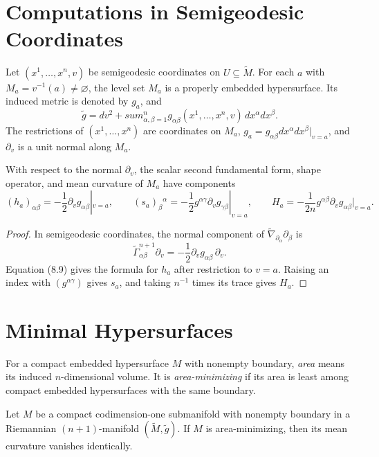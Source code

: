 \section{Computations in Semigeodesic Coordinates}

Let $(x^1,\ldots,x^n,v)$ be semigeodesic coordinates on
$U\subseteq\widetilde M$. For each $a$ with
$M_a=v^{-1}(a)\ne\varnothing$, the level set $M_a$ is a properly embedded
hypersurface. Its induced metric is denoted by $g_a$, and
\begin{equation}
\widetilde g=dv^2+sum_{\alpha,\beta=1}^n
g_{\alpha\beta}(x^1,\ldots,x^n,v)\,dx^\alpha dx^\beta. \tag{8.13}
\end{equation}
The restrictions of $(x^1,\ldots,x^n)$ are coordinates on $M_a$,
$g_a=g_{\alpha\beta}dx^\alpha dx^\beta|_{v=a}$, and $\partial_v$ is a unit
normal along $M_a$.

\begin{proposition}
\label{prop:semigeodesic-coordinates-second-form}
With respect to the normal $\partial_v$, the scalar second fundamental form,
shape operator, and mean curvature of $M_a$ have components
\[
(h_a)_{\alpha\beta}
=-\frac12\partial_vg_{\alpha\beta}|_{v=a},
\qquad
(s_a)_\beta{}^\alpha
=-\frac12g^{\alpha\gamma}\partial_vg_{\gamma\beta}|_{v=a},
\qquad
H_a=-\frac1{2n}g^{\alpha\beta}\partial_vg_{\alpha\beta}|_{v=a}.
\]
\end{proposition}

\begin{proof}
\sketch In semigeodesic coordinates, the normal component of
$\widetilde\nabla_{\partial_\alpha}\partial_\beta$ is
\[
\widetilde\Gamma^{n+1}_{\alpha\beta}\partial_v
=-\frac12\partial_vg_{\alpha\beta}\,\partial_v.
\]
Equation (8.9) gives the formula for $h_a$ after restriction to $v=a$.
Raising an index with $(g^{\alpha\gamma})$ gives $s_a$, and taking
$n^{-1}$ times its trace gives $H_a$.
\end{proof}

\section{Minimal Hypersurfaces}

For a compact embedded hypersurface $M$ with nonempty boundary, \emph{area}
means its induced $n$-dimensional volume. It is \emph{area-minimizing} if its
area is least among compact embedded hypersurfaces with the same boundary.

\begin{theorem}
\label{thm:area-minimizing-zero-mean-curvature}
Let $M$ be a compact codimension-one submanifold with nonempty boundary in a
Riemannian $(n+1)$-manifold $(\widetilde M,\widetilde g)$. If $M$ is
area-minimizing, then its mean curvature vanishes identically.
\end{theorem}

